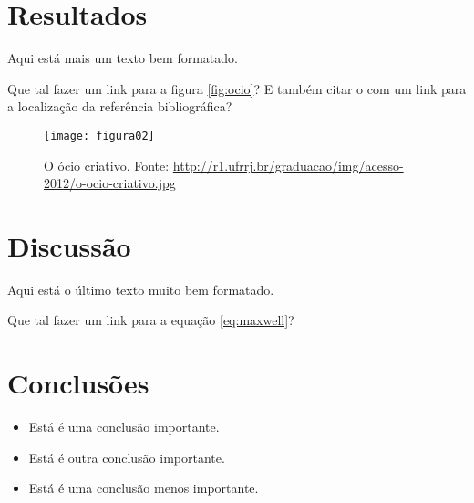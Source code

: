 \section{Resultados}

Aqui está mais um texto bem formatado. \blindtext[1]

Que tal fazer um link para a figura \autoref{fig:ocio}? E também citar o \citet{Feyerabend1977} com um link para a localização da referência bibliográfica?

\begin{figure}[!ht]
\centering
\texttt{[image: figura02]}
\caption{\label{fig:ocio}O ócio criativo. Fonte: \url{http://r1.ufrrj.br/graduacao/img/acesso-2012/o-ocio-criativo.jpg}}
\end{figure}

\section{Discussão}

Aqui está o último texto muito bem formatado. \blindtext[2]

Que tal fazer um link para a equação \autoref{eq:maxwell}?

\section{Conclusões}

\begin{itemize}
  \item Está é uma conclusão importante.
  \item Está é outra conclusão importante.
  \item Está é uma conclusão menos importante.
\end{itemize}
